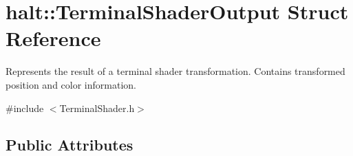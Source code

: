 \hypertarget{structhalt_1_1_terminal_shader_output}{\section{halt\-:\-:\-Terminal\-Shader\-Output \-Struct \-Reference}
\label{structhalt_1_1_terminal_shader_output}
}


\-Represents the result of a terminal shader transformation. \-Contains transformed position and color information.  




{\ttfamily \#include $<$\-Terminal\-Shader.\-h$>$}

\subsection*{\-Public \-Attributes}
